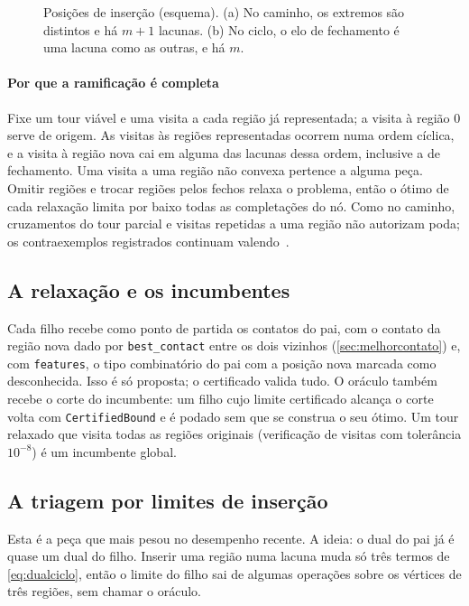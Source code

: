 \documentclass[11pt,a4paper]{article}
\theoremstyle{plain}\newtheorem{proposicao}{Proposição}
\theoremstyle{definition}\newtheorem{definicao}{Definição}
\theoremstyle{plain}\newtheorem{teorema}{Teorema}
\theoremstyle{plain}\newtheorem{lema}{Lema}
\newcommand{\code}[1]{\texttt{\small #1}}
\begin{document}
\begin{figure}[ht]\centering\figlacunas
\caption{Posições de inserção (esquema). (a) No caminho, os extremos são distintos e há \(m+1\) lacunas. (b) No ciclo, o elo de fechamento é uma lacuna como as outras, e há \(m\).}\label{fig:lacunas}
\end{figure}

\paragraph{Por que a ramificação é completa} Fixe um tour viável e uma visita a cada região já representada; a visita à região 0 serve de origem. As visitas às regiões representadas ocorrem numa ordem cíclica, e a visita à região nova cai em alguma das lacunas dessa ordem, inclusive a de fechamento. Uma visita a uma região não convexa pertence a alguma peça. Omitir regiões e trocar regiões pelos fechos relaxa o problema, então o ótimo de cada relaxação limita por baixo todas as completações do nó. Como no caminho, cruzamentos do tour parcial e visitas repetidas a uma região não autorizam poda; os contraexemplos registrados continuam valendo~\cite{contraexemplos}.

\subsection{A relaxação e os incumbentes}\label{sec:relaxacao}
Cada filho recebe como ponto de partida os contatos do pai, com o contato da região nova dado por \code{best\_contact} entre os dois vizinhos (\cref{sec:melhorcontato}) e, com \code{features}, o tipo combinatório do pai com a posição nova marcada como desconhecida. Isso é só proposta; o certificado valida tudo. O oráculo também recebe o corte do incumbente: um filho cujo limite certificado alcança o corte volta com \code{CertifiedBound} e é podado sem que se construa o seu ótimo. Um tour relaxado que visita todas as regiões originais (verificação de visitas com tolerância \(10^{-8}\)) é um incumbente global.

\subsection{A triagem por limites de inserção}\label{sec:insercao}
Esta é a peça que mais pesou no desempenho recente. A ideia: o dual do pai já é quase um dual do filho. Inserir uma região numa lacuna muda só três termos de \eqref{eq:dualciclo}, então o limite do filho sai de algumas operações sobre os vértices de três regiões, sem chamar o oráculo.
\end{document}

